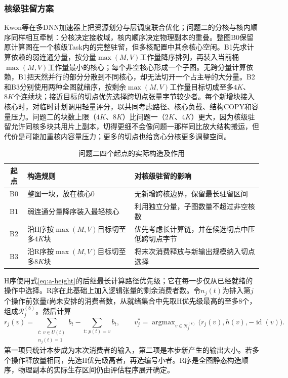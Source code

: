 \subsubsection{核级驻留方案}
Kwon等在多DNN加速器上把资源划分与层调度联合优化\cite{kwon2021heterogeneous}；问题二的分核与核内顺序同样相互牵制：分核决定接收域，核内顺序决定物理副本的重叠。整图B0保留原计算图在一个核级Task内的完整驻留，但多核配置中其余核心空闲。B1先求计算依赖的弱连通分量，按分量$\max(M,V)$工作量降序排列，再装入当前桶$\max(M,V)$工作量最小的核心；每个非空核心形成一个子图。无跨分量计算依赖，B1把天然并行的部分分散到不同核心，却无法切开一个占主导的大分量。B2和B3分别使用两种全图就绪序，按剩余$\max(M,V)$工作量目标切成至多$4K$、$8K$个连续块；接近目标的切点优先选择跨切点张量字节较少者。每个新增块接入核心时，对临时计划调用轻量评分，以共同考虑路径、核心负载、结构COPY和容量压力。问题二的块数上限（$4K$、$8K$）比问题一（$2K$、$4K$）更大，因为核级驻留允许同核多块共用片上副本，切得更细不会像问题一那样同比放大结构搬运，但代价是可能加重核内容量压力；更多的切点也给贪心分核更多调整空间。

\begin{table}[H]\centering\caption{问题二四个起点的实际构造及作用}\label{tab:b-seeds}
\begin{tabularx}{\linewidth}{cYY}\toprule
起点 & 构造规则 & 对核级驻留的影响\\\midrule
B0 & 整图一块，放在核心0 & 无新增跨核边界，保留最长驻留区间\\
B1 & 弱连通分量降序装入最轻核心 & 利用独立分量，子图数量不超过非空核数\\
B2 & 沿H序按$\max(M,V)$目标切至多$4K$块 & 优先考虑长计算链，并在候选切点中压低跨切点字节\\
B3 & 沿R序按$\max(M,V)$目标切至多$8K$块 & 将末次消费释放与新输出规模纳入切点选择\\\bottomrule
\end{tabularx}\end{table}

H序使用式\eqref{eq:a-height}的后继最长计算路径优先级；它在每一步仅从已经就绪的操作中选择。R序在此基础上加入逻辑张量的剩余消费者数。令$n_j(t)$为排入第$j$个操作前张量$t$尚未安排的消费者数，从就绪集合中先取H优先级最高的至多8个，组成$\mathcal R_j^{(8)}$。然后计算
\begin{equation}
r_j(v)=\sum_{\substack{t:\,v\in U(t)\\n_j(t)=1}}b_t
-\sum_{t:\,p(t)=v}b_t,
\qquad v_j^*=\mathop{\arg\max}_{v\in\mathcal R_j^{(8)}}
\bigl(r_j(v),h(v),-\operatorname{id}(v)\bigr).
\label{eq:b-r-order}
\end{equation}
第一项只统计本步成为末次消费者的输入，第二项是本步新产生的输出大小。若多个操作释放量相同，先选H优先级高者，再选编号小者。R序是全图静态构造顺序，物理副本的实际生存区间仍由评估程序展开确定。

